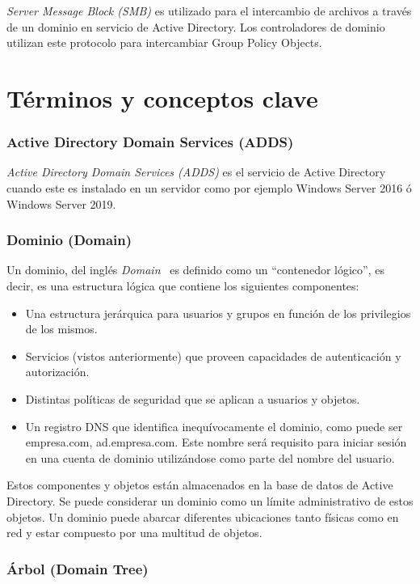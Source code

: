 {\it Server Message Block (SMB)} es utilizado para el intercambio de archivos a través de un dominio en servicio de Active Directory. Los controladores de dominio utilizan este protocolo para intercambiar Group Policy Objects. 


\section{Términos y conceptos clave}


\subsubsection{Active Directory Domain Services (ADDS)}

{\it Active Directory Domain Services (ADDS)} es el servicio de Active Directory cuando este es instalado en un servidor como por ejemplo Windows Server 2016 ó Windows Server 2019.

\subsubsection{Dominio (Domain)}

Un dominio, del inglés {\it Domain}~\cite{Capitulo4:Domain} es definido como un ``contenedor lógico'', es decir, es una estructura lógica que contiene los siguientes componentes:

\begin{itemize}
\item Una estructura jerárquica para usuarios y grupos en función de los privilegios de los mismos.
\item Servicios (vistos anteriormente) que proveen capacidades de autenticación y au\-to\-ri\-za\-ción.
\item Distintas políticas de seguridad que se aplican a usuarios y objetos.
\item Un registro DNS que identifica inequívocamente el dominio, como puede ser empresa.com, ad.empresa.com. Este nombre será requisito para iniciar sesión en una cuenta de dominio utilizándose como parte del nombre del usuario. 
\end{itemize}

Estos componentes y objetos están almacenados en la base de datos de Active Directory. Se puede considerar un dominio como un límite administrativo de estos objetos. Un dominio puede abarcar diferentes ubicaciones tanto físicas como en red y estar compuesto por una multitud de objetos.

\subsubsection{Árbol (Domain Tree)}

